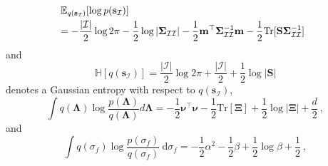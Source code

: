 \documentclass[conference]{IEEEtran}
\begin{document}
	\begin{equation*}
	\hspace{-1.7mm}
	\begin{array}{l}
		\displaystyle\mathbb{E}_{q(\mathbf{s}_\mathcal{I})}[\log p(\mathbf{s}_\mathcal{I})]\vspace{1mm}\\
		\displaystyle=-\frac{|\mathcal{I}|}{2}\log2\pi-\frac{1}{2}\log|\mathbf{\Sigma}_\mathcal{II}|-\frac{1}{2}\mathbf{m}^\top\mathbf{\Sigma}_\mathcal{II}^{-1}\mathbf{m}-\frac{1}{2}\mathrm{Tr}[\mathbf{S}\mathbf{\Sigma}_\mathcal{II}^{-1}]
	\end{array}
	\end{equation*}
and 
$$
\displaystyle\mathbb{H}[q(\mathbf{s}_\mathcal{I})]=\frac{|\mathcal{I}|}{2}\log2\pi+\frac{|\mathcal{I}|}{2}+\frac{1}{2}\log|\mathbf{S}|
$$
\vspace{-1mm}
denotes a Gaussian entropy with respect to $q(\mathbf{s}_\mathcal{I})$,	
$$
\displaystyle\int q(\mathbf{\Lambda})\log\dfrac{p(\mathbf{\Lambda})}{q(\mathbf{\Lambda})}d\mathbf{\Lambda}=-\dfrac{1}{2}\boldsymbol{\nu}^\top\boldsymbol{\nu}-\dfrac{1}{2}\mathrm{Tr}[\mathbf{\Xi}]+\dfrac{1}{2}\log|\mathbf{\Xi}|+\dfrac{d}{2}\ ,
$$
and
$$	
\displaystyle \int q(\sigma_f)\log\dfrac{p(\sigma_f)}{q(\sigma_f)}\ \mathrm{d}\sigma_f=-\dfrac{1}{2}\alpha^2-\dfrac{1}{2}\beta+\dfrac{1}{2}\log \beta+\dfrac{1}{2}\ ,
$$
\end{document}
